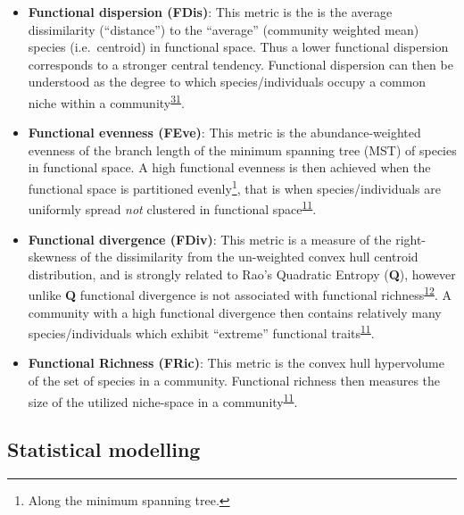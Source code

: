 \documentclass[
  10pt,
]{article}
\begin{document}
\begin{itemize}
\item
  \textbf{Functional dispersion (FDis)}: This metric is the is the average dissimilarity (``distance'') to the ``average'' (community weighted mean) species (i.e.~centroid) in functional space. Thus a lower functional dispersion corresponds to a stronger central tendency. Functional dispersion can then be understood as the degree to which species/individuals occupy a common niche within a community\textsuperscript{\protect\hyperlink{ref-Laliberte2010}{31}}.
\item
  \textbf{Functional evenness (FEve)}: This metric is the abundance-weighted evenness of the branch length of the minimum spanning tree (MST) of species in functional space. A high functional evenness is then achieved when the functional space is partitioned evenly\footnote{Along the minimum spanning tree.}, that is when species/individuals are uniformly spread \emph{not} clustered in functional space\textsuperscript{\protect\hyperlink{ref-Villeger2008}{11}}.
\item
  \textbf{Functional divergence (FDiv)}: This metric is a measure of the right-skewness of the dissimilarity from the un-weighted convex hull centroid distribution, and is strongly related to Rao's Quadratic Entropy (\textbf{Q}), however unlike \textbf{Q} functional divergence is not associated with functional richness\textsuperscript{\protect\hyperlink{ref-Mouchet2010}{12}}. A community with a high functional divergence then contains relatively many species/individuals which exhibit ``extreme'' functional traits\textsuperscript{\protect\hyperlink{ref-Villeger2008}{11}}.
\item
  \textbf{Functional Richness (FRic)}: This metric is the convex hull hypervolume of the set of species in a community. Functional richness then measures the size of the utilized niche-space in a community\textsuperscript{\protect\hyperlink{ref-Villeger2008}{11}}.
\end{itemize}

\hypertarget{modelling}{%
\subsection{Statistical modelling}\label{modelling}}
\end{document}
